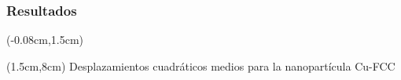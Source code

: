 \begin{frame}
 \frametitle{Resultados}
 
 \begin{textblock*}{12.6cm}(-0.08cm,1.5cm) 
      \begin{figure}[htp]
	\centering
      \end{figure}
    \end{textblock*}
    \begin{textblock*}{10cm}(1.5cm,8cm) 
    \centering
      Desplazamientos cuadráticos medios para la nanopartícula Cu-FCC
 \end{textblock*}
\end{frame}

